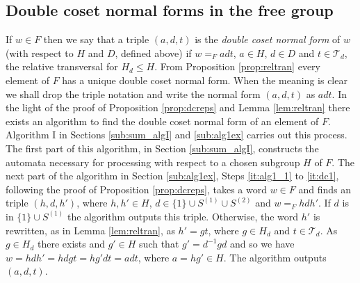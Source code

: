 \documentclass[a4paper,12pt]{article}
\numberwithin{equation}{section}
\numberwithin{figure}{section}
\newcommand{\cT}{\mathcal{T}}
\begin{document}
\subsection{Double coset normal forms in the free group}
If $w\in F$ then we say that a triple $(a,d,t)$ is the 
\emph{double coset normal form} of $w$ 
(with respect to $H$ and $D$, defined above) if $w=_F adt$, 
$a\in H$, $d \in D$ and $t\in \cT_d$, the relative transversal 
for $H_d\le H$. From Proposition \ref{prop:reltran} every element
of $F$ has a unique double coset normal form. When the meaning
is clear we shall drop the triple notation and write the
normal form $(a,d,t)$  as $adt$. 
In the light of the proof of  Proposition \ref{prop:dcreps} and  Lemma 
\ref{lem:reltran} there exists an
 algorithm to find the double coset normal form of an element of $F$. 
Algorithm I in  Sections \ref{sub:sum_algI} and  \ref{sub:alg1ex} carries out this process. The first part of
this  algorithm, in Section \ref{sub:sum_algI}, constructs the 
automata necessary for processing  with respect to a chosen
 subgroup $H$ of $F$. The next part of  the  algorithm in 
Section \ref{sub:alg1ex},  Steps \ref{it:alg1_1} to \ref{it:dc1},
following the proof of Proposition \ref{prop:dcreps},  
  takes  a word  $w\in F$ and finds an triple
$(h,d,h')$, where $h,h'\in H$, $d\in \{1\}\cup S^{(1)}\cup S^{(2)}$
and $w=_F hdh'$. If $d$ is in $\{1\}\cup S^{(1)}$ the algorithm
outputs this triple. Otherwise, the word $h'$ is rewritten, 
as in   
Lemma \ref{lem:reltran}, as $h'=gt$, where $g\in H_d$ and  $t\in \cT_d$.
As $g\in H_d$ there exists  and $g'\in H$ such that $g'=d^{-1}gd$ 
and so we have $w=hdh'=hdgt=hg'dt=adt$, where $a=hg'\in H$. The 
  algorithm outputs $(a,d,t)$. 
\end{document}
